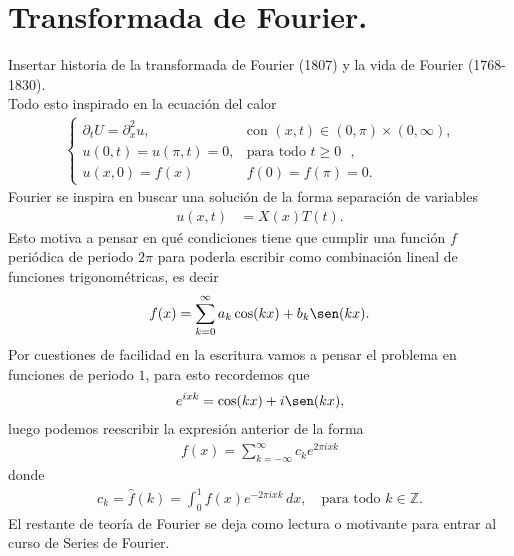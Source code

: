 \section{Transformada de Fourier.}
  Insertar historia de la transformada de Fourier (1807) y la vida de Fourier (1768-1830).\\
  Todo esto inspirado en la ecuación del calor
  \begin{align*}
    \begin{cases}
      \partial_{t}U=\partial^{2}_{x}u,&\text{con $(x,t)\in(0,\pi)\times (0,\infty)$,}\\
      u(0,t)=u(\pi,t)=0, &\text{para todo $t\geq 0$ },\\
      u(x,0)=f(x)&f(0)=f(\pi)=0.
    \end{cases}
  \end{align*}
  Fourier se inspira en buscar una solución de la forma separación de variables
  \begin{align*}
    u(x,t)&=X(x)T(t).
  \end{align*}
  Esto motiva a pensar en qué condiciones tiene que cumplir una función $f$ periódica de periodo $2\pi$ para poderla escribir como combinación lineal de funciones trigonométricas, es decir
  \begin{align*}
    f(x)=\sum_{k=0}^{\infty}a_{k}\cos(kx)+b_k\sen(kx).
  \end{align*}
  Por cuestiones de facilidad en la escritura vamos a pensar el problema en funciones de periodo $1$, para esto recordemos que
  \begin{align*}
    e^{ixk}=\cos(kx)+i\sen(kx),
  \end{align*}
  luego podemos reescribir la expresión anterior de la forma
  \begin{align*}
    f(x)=\sum_{k=-\infty}^{\infty}c_{k}e^{2\pi ixk}
  \end{align*}
  donde
  \begin{align*}
    c_{k}=\hat{f}(k)=\int_{0}^{1}f(x)e^{-2\pi i xk}\,dx,\quad\text{para todo $k\in\mathbb{Z}$.}
  \end{align*}
  El restante de teoría de Fourier se deja como lectura o motivante para entrar al curso de Series de Fourier.
